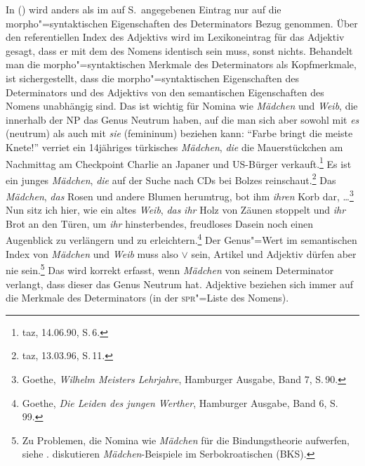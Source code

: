 \noindent
In () wird anders als im auf S.\,\pageref{le-kleinen-sem}
angegebenen Eintrag nur auf die morpho"=syntaktischen Eigenschaften des Determinators Bezug genommen.
Über den referentiellen Index des Adjektivs wird im Lexikoneintrag für das Adjektiv gesagt, dass er mit dem des Nomens
identisch sein muss, sonst nichts. Behandelt man die morpho"=syntaktischen Merkmale des Determinators als
Kopfmerkmale, ist sichergestellt, dass die morpho"=syntaktischen Eigenschaften
des Determinators und des Adjektivs von den semantischen Eigenschaften des Nomens unabhängig sind.
Das ist wichtig für Nomina wie \emph{Mädchen} und \emph{Weib}, die innerhalb der NP das Genus Neutrum
haben, auf die man sich aber sowohl mit \emph{es} (neutrum) als auch mit \emph{sie} (femininum) beziehen kann:
\eal
\ex "`Farbe bringt die meiste Knete!"' verriet ein 14jähriges türkisches \emph{Mädchen}, \emph{die} die Mauerstückchen am
      Nachmittag am Checkpoint Charlie an Japaner und US-Bürger verkauft.\footnote{
        taz, 14.06.90, S.\,6.
      }
\ex Es ist ein junges \emph{Mädchen}, \emph{die} auf der Suche nach CDs bei Bolzes reinschaut.\footnote{
        taz, 13.03.96, S.\,11.
      }
\zl
\eal
\label{bsp-neu-neu-goethe}
\ex Das \emph{Mädchen}, \emph{das} Rosen und andere Blumen herumtrug, bot ihm \emph{ihren} Korb
dar, \ldots\footnote{
        Goethe, \emph{Wilhelm Meisters Lehrjahre}, Hamburger Ausgabe, Band 7, S.\,90.
      }
\ex Nun sitz ich hier, wie ein altes \emph{Weib}, \emph{das} \emph{ihr} Holz von Zäunen stoppelt
      und \emph{ihr} Brot an den Türen, um \emph{ihr} hinsterbendes, freudloses Dasein noch einen
      Augenblick zu verlängern und zu erleichtern.\footnote{
        Goethe, \emph{Die Leiden des jungen Werther}, Hamburger Ausgabe, Band 6, S.\,99.
      }\label{bsp-goethe-altes-weib}
\zl
Der Genus"=Wert im semantischen Index von \emph{Mädchen} und \emph{Weib} muss also  $\vee$  sein, Artikel
und Adjektiv dürfen aber nie  sein.\footnote{
  Zu Problemen, die Nomina wie \emph{Mädchen} für die Bindungstheorie aufwerfen,
  siehe . \citet[199--200]{WZ2003a} diskutieren
  \emph{Mädchen}-Beispiele im Serbokroatischen (BKS).%
%
}
Das wird korrekt erfasst, wenn \emph{Mädchen} von seinem Determinator verlangt,
dass dieser das Genus Neutrum hat. Adjektive beziehen sich immer auf die Merkmale des Determinators (in der \textsc{spr}"=Liste
des Nomens).

